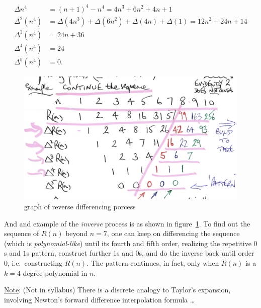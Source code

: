 \documentclass[12pt]{report}
\theoremstyle{definition}
\begin{document}
\begin{ex}
    \;

    \[
        \begin{align*}
            \Delta n^{4} & = {(n + 1)}^{4} - n^{4} = 4n^{3} + 6n^{2} + 4n + 1 \\
            \Delta^{2} (n^{4}) & = \Delta (4n^{3}) + \Delta (6n^{2}) + \Delta (4n) + \Delta (1) 
            = 12n^{2} + 24n + 14 \\
            \Delta^{3} (n^{4}) & = 24n + 36 \\
            \Delta^{4} (n^{4}) & = 24 \\
            \Delta^{5} (n^{4}) & = 0.
        \end{align*}
    \]

    \begin{figure}
    \includegraphics[scale = 0.15]{inverseDifferencing.jpg}
    \centering
    \caption{graph of reverse differencing porcess}\label{fig:invDiff}
    \end{figure}
    
    \noindent And and example of the \emph{inverse} process is as shown in figure~\ref{fig:invDiff}.
    To find out the sequence of $R(n)$ beyond $n = 7$, one can keep on differencing
    the sequence (which is \emph{polynomial-like}) until its fourth and fifth order,
    realizing the repetitive $0$s and $1$s pattern, construct further 1s and 0s,
    and do the inverse back until order 0, i.e.\ constructing $R(n)$. 
    The pattern continues, in fact, only when $R(n)$ is a $k = 4$ degree polynomial in $n$.

    \medskip
    \noindent \underline{Note}: (Not in syllabus) There is a discrete analogy to Taylor's expansion,
    involving Newton's forward difference interpolation formula \ldots
\end{ex}
\end{document}

